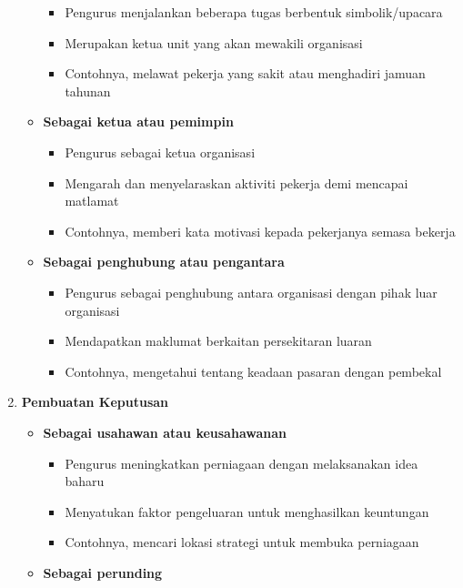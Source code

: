 \documentclass{book}
\begin{document}
\begin{multicols*}{2}
\begin{enumerate}
\begin{itemize}[leftmargin=*]
          \begin{itemize}[leftmargin=*]
            \item Pengurus menjalankan beberapa tugas berbentuk simbolik/upacara
            \item Merupakan ketua unit yang akan mewakili organisasi
            \item Contohnya, melawat pekerja yang sakit atau menghadiri jamuan tahunan
          \end{itemize}
        \item \textbf{Sebagai ketua atau pemimpin}
          \begin{itemize}[leftmargin=*]
            \item Pengurus sebagai ketua organisasi
            \item Mengarah dan menyelaraskan aktiviti pekerja demi mencapai matlamat
            \item Contohnya, memberi kata motivasi kepada pekerjanya semasa bekerja 
          \end{itemize}
        \newpage
        \item \textbf{Sebagai penghubung atau pengantara}
          \begin{itemize}[leftmargin=*]
            \item Pengurus sebagai penghubung antara organisasi dengan pihak luar organisasi
            \item Mendapatkan maklumat berkaitan persekitaran luaran
            \item Contohnya, mengetahui tentang keadaan pasaran dengan pembekal
          \end{itemize}
      \end{itemize}
      \item \textbf{Pembuatan Keputusan}
      \begin{itemize}[leftmargin=*]
        \item \textbf{Sebagai usahawan atau keusahawanan} 
          \begin{itemize}[leftmargin=*]
            \item Pengurus meningkatkan perniagaan dengan melaksanakan idea baharu
            \item Menyatukan faktor pengeluaran untuk menghasilkan keuntungan
            \item Contohnya, mencari lokasi strategi untuk membuka perniagaan
          \end{itemize}
        \item \textbf{Sebagai perunding}
          \begin{itemize}[leftmargin=*]

\end{itemize}
\end{itemize}
\end{enumerate}
\end{multicols*}
\end{document}
